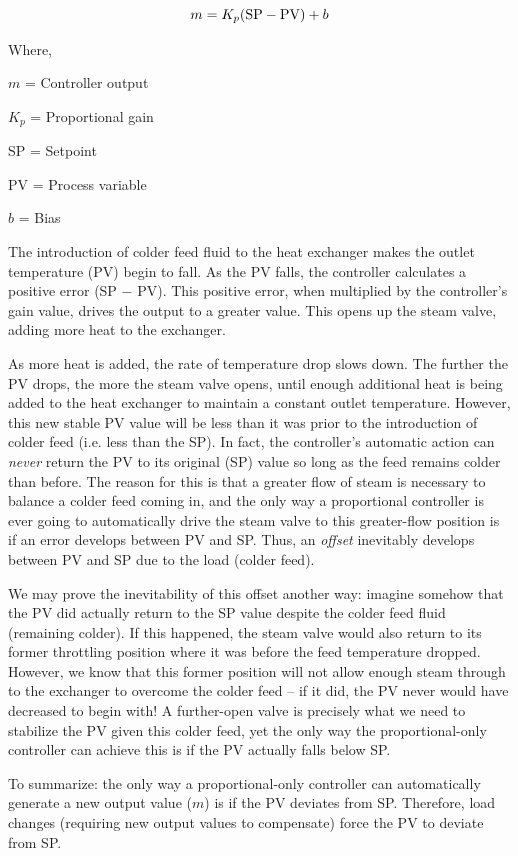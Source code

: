 $$m = K_p (\hbox{SP} - \hbox{PV}) + b$$

\noindent
Where,

$m$ = Controller output

$K_p$ = Proportional gain

SP = Setpoint

PV = Process variable

$b$ = Bias

\vskip 10pt

The introduction of colder feed fluid to the heat exchanger makes the outlet temperature (PV) begin to fall.  As the PV falls, the controller calculates a positive error (SP $-$ PV).  This positive error, when multiplied by the controller's gain value, drives the output to a greater value.  This opens up the steam valve, adding more heat to the exchanger.

As more heat is added, the rate of temperature drop slows down.  The further the PV drops, the more the steam valve opens, until enough additional heat is being added to the heat exchanger to maintain a constant outlet temperature.  However, this new stable PV value will be less than it was prior to the introduction of colder feed (i.e. less than the SP).  In fact, the controller's automatic action can \textit{never} return the PV to its original (SP) value so long as the feed remains colder than before.  The reason for this is that a greater flow of steam is necessary to balance a colder feed coming in, and the only way a proportional controller is ever going to automatically drive the steam valve to this greater-flow position is if an error develops between PV and SP.  Thus, an \textit{offset} inevitably develops between PV and SP due to the load (colder feed).

We may prove the inevitability of this offset another way: imagine somehow that the PV did actually return to the SP value despite the colder feed fluid (remaining colder).  If this happened, the steam valve would also return to its former throttling position where it was before the feed temperature dropped.  However, we know that this former position will not allow enough steam through to the exchanger to overcome the colder feed -- if it did, the PV never would have decreased to begin with!  A further-open valve is precisely what we need to stabilize the PV given this colder feed, yet the only way the proportional-only controller can achieve this is if the PV actually falls below SP.

To summarize: the only way a proportional-only controller can automatically generate a new output value ($m$) is if the PV deviates from SP.  Therefore, load changes (requiring new output values to compensate) force the PV to deviate from SP.

